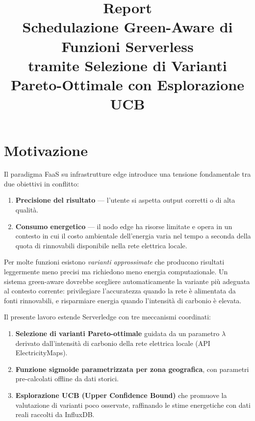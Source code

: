 \documentclass[a4paper,11pt]{article}
\title{\textbf{Report}\\[0.4em]
\large Schedulazione Green-Aware di Funzioni Serverless\\
tramite Selezione di Varianti Pareto-Ottimale con Esplorazione UCB}
\author{}
\date{}
\begin{document}
\maketitle

\section{Motivazione}

Il paradigma FaaS su infrastrutture edge introduce una tensione fondamentale tra due
obiettivi in conflitto:

\begin{enumerate}
  \item \textbf{Precisione del risultato} --- l'utente si aspetta output corretti o di
    alta qualità.
  \item \textbf{Consumo energetico} --- il nodo edge ha risorse limitate e opera in un
    contesto in cui il costo ambientale dell'energia varia nel tempo a seconda della
    quota di rinnovabili disponibile nella rete elettrica locale.
\end{enumerate}

Per molte funzioni esistono \textit{varianti approssimate} che producono risultati
leggermente meno precisi ma richiedono meno energia computazionale. Un sistema
green-aware dovrebbe scegliere automaticamente la variante più adeguata al contesto
corrente: privilegiare l'accuratezza quando la rete è alimentata da fonti rinnovabili,
e risparmiare energia quando l'intensità di carbonio è elevata.

Il presente lavoro estende Serverledge con tre meccanismi coordinati:

\begin{enumerate}
  \item \textbf{Selezione di varianti Pareto-ottimale} guidata da un parametro
    $\lambda$ derivato dall'intensità di carbonio della rete elettrica locale
    (API ElectricityMaps).
  \item \textbf{Funzione sigmoide parametrizzata per zona geografica}, con parametri
    pre-calcolati offline da dati storici.
  \item \textbf{Esplorazione UCB (Upper Confidence Bound)} che promuove la valutazione
    di varianti poco osservate, raffinando le stime energetiche con dati reali raccolti
    da InfluxDB.
\end{enumerate}
\end{document}
